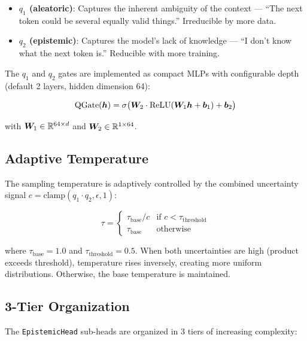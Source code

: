 \begin{itemize}
    \item \textbf{$q_1$ (aleatoric)}: Captures the inherent ambiguity of
    the context --- ``The next token could be several equally valid
    things.'' Irreducible by more data.

    \item \textbf{$q_2$ (epistemic)}: Captures the model's lack of
    knowledge --- ``I don't know what the next token is.'' Reducible
    with more training.
\end{itemize}

The $q_1$ and $q_2$ gates are implemented as compact MLPs with
configurable depth (default 2 layers, hidden dimension 64):

\begin{equation}
    \text{QGate}(\bm{h}) = \sigma\big(\bm{W}_2 \cdot \text{ReLU}(\bm{W}_1 \bm{h} + \bm{b}_1) + \bm{b}_2\big)
\end{equation}

with $\bm{W}_1 \in \mathbb{R}^{64 \times d}$ and $\bm{W}_2 \in \mathbb{R}^{1 \times 64}$.

\subsection{Adaptive Temperature}

The sampling temperature is adaptively controlled by the combined
uncertainty signal $c = \text{clamp}(q_1 \cdot q_2, \epsilon, 1)$:

\begin{equation}
    \tau = \begin{cases}
        \tau_{\text{base}} / c & \text{if } c < \tau_{\text{threshold}} \\
        \tau_{\text{base}} & \text{otherwise}
    \end{cases}
\end{equation}

where $\tau_{\text{base}} = 1.0$ and $\tau_{\text{threshold}} = 0.5$.
When both uncertainties are high (product exceeds threshold), temperature
rises inversely, creating more uniform distributions. Otherwise, the
base temperature is maintained.

\subsection{3-Tier Organization}

The \texttt{EpistemicHead} sub-heads are organized in 3 tiers of
increasing complexity:

